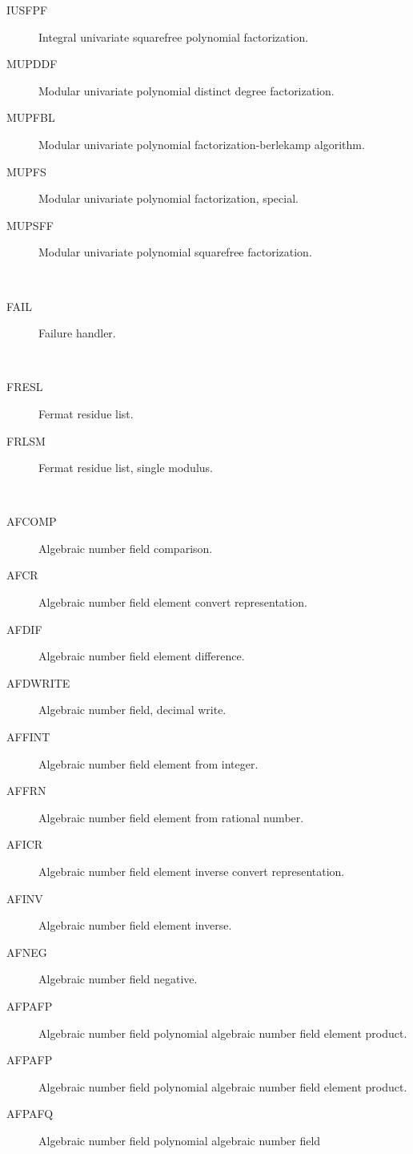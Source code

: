 \begin{description}
\begin{description}
  \item[IUSFPF]  Integral univariate squarefree polynomial factorization.
  \item[MUPDDF]  Modular univariate polynomial distinct degree factorization.
  \item[MUPFBL]  Modular univariate polynomial factorization-berlekamp
    algorithm.
  \item[MUPFS]  Modular univariate polynomial factorization, special.
  \item[MUPSFF]  Modular univariate polynomial squarefree factorization.
  \end{description}
\item[failure] \ \ 
  \begin{description}
  \item[FAIL]  Failure handler.
  \end{description}
\item[fermat] \ \ 
  \begin{description}
  \item[FRESL]  Fermat residue list.
  \item[FRLSM]  Fermat residue list, single modulus.
  \end{description}
\item[field] \ \ 
  \begin{description}
  \item[AFCOMP]  Algebraic number field comparison.
  \item[AFCR]  Algebraic number field element convert representation.
  \item[AFDIF]  Algebraic number field element difference.
  \item[AFDWRITE]  Algebraic number field, decimal write.
  \item[AFFINT]  Algebraic number field element from integer.
  \item[AFFRN]  Algebraic number field element from rational number.
  \item[AFICR]  Algebraic number field element inverse convert representation.
  \item[AFINV]  Algebraic number field element inverse.
  \item[AFNEG]  Algebraic number field negative.
  \item[AFPAFP]  Algebraic number field polynomial algebraic number field
    element product.
  \item[AFPAFP]  Algebraic number field polynomial algebraic number field
    element product.
  \item[AFPAFQ]  Algebraic number field polynomial algebraic number field

\end{description}
\end{description}
